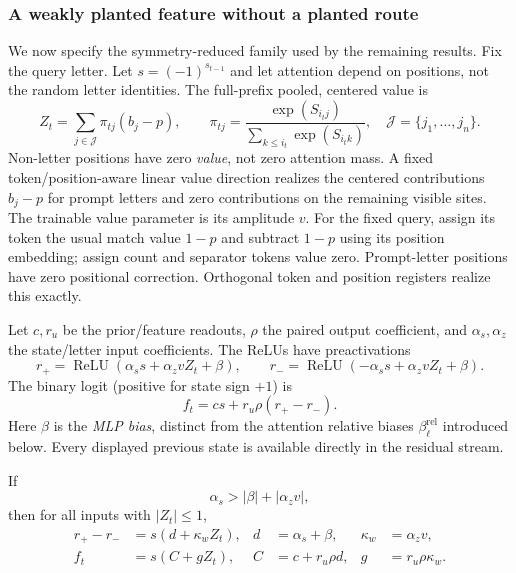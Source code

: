 \subsubsection{A weakly planted feature without a planted route}
\label{app:weak-routing-family}

We now specify the symmetry-reduced family used by the remaining results.
Fix the query letter. Let $s=(-1)^{s_{t-1}}$ and let attention depend on positions, not the
random letter identities.  The full-prefix pooled, centered value is
\begin{equation}\label{eq:lr-centered-value}
 Z_t=\sum_{j\in\mathcal J}\pi_{tj}(b_j-p),\qquad
 \pi_{tj}=\frac{\exp(S_{i_tj})}{\sum_{k\le i_t}\exp(S_{i_tk})},
 \quad \mathcal J=\{j_1,\ldots,j_n\}.
\end{equation}
Non-letter positions have zero \emph{value}, not zero attention mass.
A fixed token/position-aware linear value direction realizes the centered contributions
$b_j-p$ for prompt letters and zero contributions on the remaining visible
sites.  The trainable value parameter is its amplitude $v$. For the fixed query, assign its token the usual match
value $1-p$ and subtract $1-p$ using its position embedding; assign count
and separator tokens value zero. Prompt-letter positions have zero positional
correction. Orthogonal token and position registers realize this exactly.

Let $c,r_u$ be the prior/feature readouts, $\rho$ the paired output coefficient,
and $\alpha_s,\alpha_z$ the state/letter input coefficients. The ReLUs have preactivations
\begin{equation}\label{eq:lr-gates}
 r_+=\operatorname{ReLU}(\alpha_s s+\alpha_z vZ_t+\beta),\qquad
 r_-=\operatorname{ReLU}(-\alpha_s s+\alpha_z vZ_t+\beta).
\end{equation}
The binary logit (positive for state sign $+1$) is
\begin{equation}\label{eq:lr-factor-logit}
 f_t=cs+r_u\rho(r_+-r_-).
\end{equation}
Here $\beta$ is the \emph{MLP bias}, distinct from the attention
relative biases $\beta_\ell^{\mathrm{rel}}$ introduced below.
Every displayed previous state is available directly in the residual stream.

If
\begin{equation}\label{eq:lr-gate-condition}
 \alpha_s>|\beta|+|\alpha_z v|,
\end{equation}
then for all inputs with $|Z_t|\le1$,
\begin{equation}\label{eq:lr-feature-param}
 \begin{aligned}
 r_+-r_-&=s(d+\kappa_w Z_t),& d&=\alpha_s+\beta,& \kappa_w&=\alpha_z v,\\
 f_t&=s(C+gZ_t),& C&=c+r_u\rho d,& g&=r_u\rho \kappa_w.
 \end{aligned}
\end{equation}

